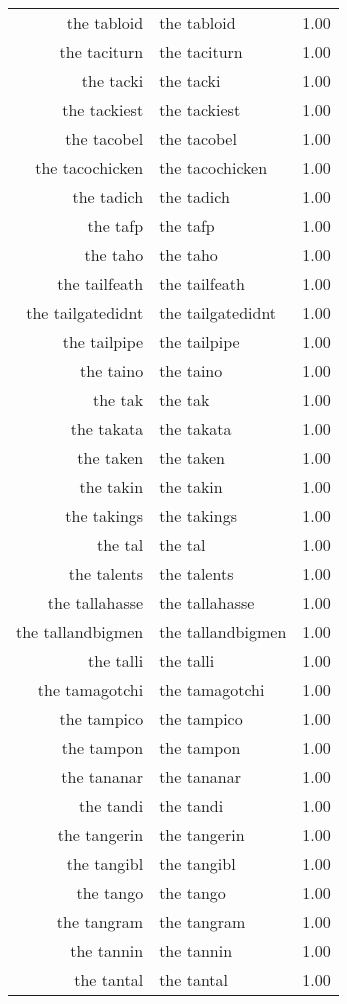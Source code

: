 \begin{table}[ht]
\begin{tabular}{rlr}
  the tabloid & the tabloid & 1.00 \\ 
  the taciturn & the taciturn & 1.00 \\ 
  the tacki & the tacki & 1.00 \\ 
  the tackiest & the tackiest & 1.00 \\ 
  the tacobel & the tacobel & 1.00 \\ 
  the tacochicken & the tacochicken & 1.00 \\ 
  the tadich & the tadich & 1.00 \\ 
  the tafp & the tafp & 1.00 \\ 
  the taho & the taho & 1.00 \\ 
  the tailfeath & the tailfeath & 1.00 \\ 
  the tailgatedidnt & the tailgatedidnt & 1.00 \\ 
  the tailpipe & the tailpipe & 1.00 \\ 
  the taino & the taino & 1.00 \\ 
  the tak & the tak & 1.00 \\ 
  the takata & the takata & 1.00 \\ 
  the taken & the taken & 1.00 \\ 
  the takin & the takin & 1.00 \\ 
  the takings & the takings & 1.00 \\ 
  the tal & the tal & 1.00 \\ 
  the talents & the talents & 1.00 \\ 
  the tallahasse & the tallahasse & 1.00 \\ 
  the tallandbigmen & the tallandbigmen & 1.00 \\ 
  the talli & the talli & 1.00 \\ 
  the tamagotchi & the tamagotchi & 1.00 \\ 
  the tampico & the tampico & 1.00 \\ 
  the tampon & the tampon & 1.00 \\ 
  the tananar & the tananar & 1.00 \\ 
  the tandi & the tandi & 1.00 \\ 
  the tangerin & the tangerin & 1.00 \\ 
  the tangibl & the tangibl & 1.00 \\ 
  the tango & the tango & 1.00 \\ 
  the tangram & the tangram & 1.00 \\ 
  the tannin & the tannin & 1.00 \\ 
  the tantal & the tantal & 1.00 \\ 

\end{tabular}
\end{table}
